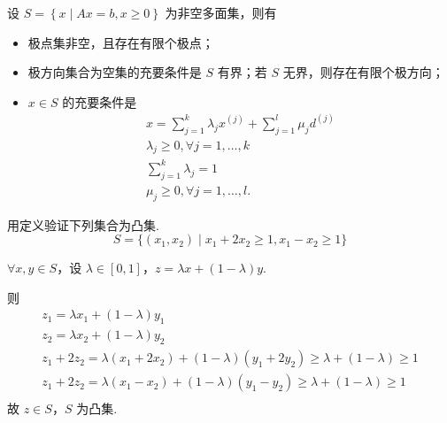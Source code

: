 \begin{theorem}[多面集表示定理]
    设 $S = \left\{x \mid Ax = b, x \ge 0\right\}$ 为非空多面集，则有
    \begin{itemize}
        \item 极点集非空，且存在有限个极点；
        \item 极方向集合为空集的充要条件是 $S$ 有界；若 $S$ 无界，则存在有限个极方向；
        \item $x \in S$ 的充要条件是 \begin{gather*}
            x = \sum_{j = 1}^k \lambda_j x^{(j)} + \sum_{j = 1}^l \mu_j d^{(j)}\\
            \lambda_j \ge 0, \forall j = 1, \dots, k\\
            \sum_{j = 1}^k \lambda_j = 1\\
            \mu_j \ge 0, \forall j = 1, \dots, l \text{.}
        \end{gather*}
    \end{itemize}
\end{theorem}

\begin{example}
    用定义验证下列集合为凸集.
    \[S = \{(x_1, x_2) \mid x_1 + 2x_2 \ge 1, x_1 - x_2 \ge 1\}\]

    \answer $\forall x, y \in S$，设 $\lambda \in [0, 1]$，$z = \lambda x + (1 - \lambda)y$.

    则
    \begin{gather*}
        z_1 = \lambda x_1 + (1 - \lambda)y_1\\
        z_2 = \lambda x_2 + (1 - \lambda)y_2\\
        z_1 + 2z_2 = \lambda(x_1 + 2x_2) + (1 - \lambda)(y_1 + 2y_2) \ge \lambda + (1 - \lambda) \ge 1\\
        z_1 + 2z_2 = \lambda(x_1 - x_2) + (1 - \lambda)(y_1 - y_2) \ge \lambda + (1 - \lambda) \ge 1\\
    \end{gather*}
    故 $z \in S$，$S$ 为凸集.
\end{example}


